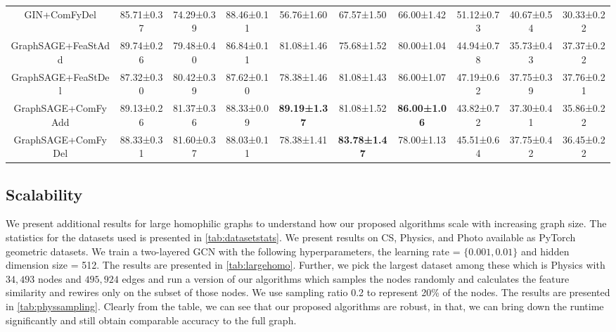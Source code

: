 \begin{table}[ht]
{\begin{tabular}{@{}cccccccccc@{}}
GIN+ComFyDel       & 85.71±0.37 & 74.29±0.39 & 88.46±0.11 & 56.76±1.60 & 67.57±1.50 & 66.00±1.42 & 51.12±0.73 & 40.67±0.54 & 30.33±0.22 \\  
GraphSAGE+FeaStAdd & 89.74±0.26 & 79.48±0.40 & 86.84±0.11 & 81.08±1.46 & 75.68±1.52 & 80.00±1.04 & 44.94±0.78 & 35.73±0.43 & 37.37±0.22 \\
GraphSAGE+FeaStDel & 87.32±0.30 & 80.42±0.39 & 87.62±0.10 & 78.38±1.46 & 81.08±1.43 & 86.00±1.07 & 47.19±0.62 & 37.75±0.39 & 37.76±0.21 \\
GraphSAGE+ComFyAdd & 89.13±0.26 & 81.37±0.36 & 88.33±0.09 & \textbf{89.19±1.37} & 81.08±1.52 & \textbf{86.00±1.06} & 43.82±0.72 & 37.30±0.41 & 35.86±0.22 \\
GraphSAGE+ComFyDel & 88.33±0.31 & 81.60±0.37 & 88.03±0.11 & 78.38±1.41 & \textbf{83.78±1.47} & 78.00±1.13 & 45.51±0.64 & 37.75±0.42 & 36.45±0.22 \\ 
\bottomrule
\end{tabular}%
}
\end{table}


\subsection{Scalability}\label{app:scale}
We present additional results for large homophilic graphs to understand how our proposed algorithms scale with increasing graph size. The statistics for the datasets used is presented in \autoref{tab:datasetstats}. We present results on CS, Physics, and Photo \citep{shchur2019pitfalls} available as PyTorch geometric datasets. We train a two-layered GCN with the following hyperparameters, the learning rate = $\{0.001, 0.01\}$ and hidden dimension size = 512. The results are presented in \autoref{tab:largehomo}. Further, we pick the largest dataset among these which is Physics with $34,493$ nodes and $495,924$ edges and run a version of our algorithms which samples the nodes randomly and calculates the feature similarity and rewires only on the subset of those nodes. We use sampling ratio 0.2 to represent 20\% of the nodes. The results are presented in \autoref{tab:physsampling}. Clearly from the table, we can see that our proposed algorithms are robust, in that, we can bring down the runtime significantly and still obtain comparable accuracy to the full graph.

